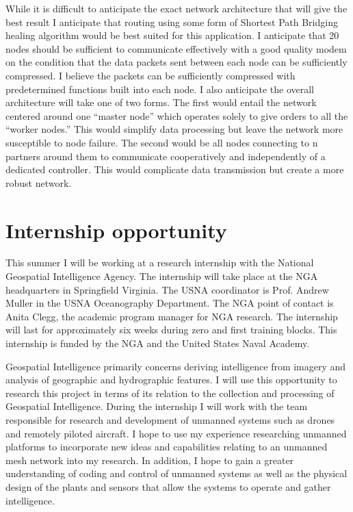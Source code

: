 \documentclass[10pt]{article}
\begin{document}
While it is difficult to anticipate the exact network architecture that will give the best result I anticipate that routing using some form of Shortest Path Bridging healing algorithm would be best suited for this application. I anticipate that 20 nodes should be sufficient to communicate effectively with a good quality modem on the condition that the data packets sent between each node can be sufficiently compressed. I believe the packets can be sufficiently compressed with predetermined functions built into each node. I also anticipate the overall architecture will take one of two forms. The first would entail the network centered around one “master node” which operates solely to give orders to all the “worker nodes.” This would simplify data processing but leave the network more susceptible to node failure. The second would be all nodes connecting to n partners around them to communicate cooperatively and independently of a dedicated controller. This would complicate data transmission but create a more robust network. 

\section{Internship opportunity}
	This summer I will be working at a research internship with the National Geospatial Intelligence Agency. The internship will take place at the NGA headquarters in Springfield Virginia. The USNA coordinator is Prof. Andrew Muller in the USNA Oceanography Department. The NGA point of contact is Anita Clegg, the academic program manager for NGA research. The internship will last for approximately six weeks during zero and first training blocks. This internship is funded by the NGA and the United States Naval Academy.
	
Geospatial Intelligence primarily concerns deriving intelligence from imagery and analysis of geographic and hydrographic features. I will use this opportunity to research this project in terms of its relation to the collection and processing of Geospatial Intelligence. During the internship I will work with the team responsible for research and development of unmanned systems such as drones and remotely piloted aircraft. I hope to use my experience researching unmanned platforms to incorporate new ideas and capabilities relating to an unmanned mesh network into my research. In addition, I hope to gain a greater understanding of coding and control of unmanned systems as well as the physical design of the plants and sensors that allow the systems to operate and gather intelligence.
\end{document}
